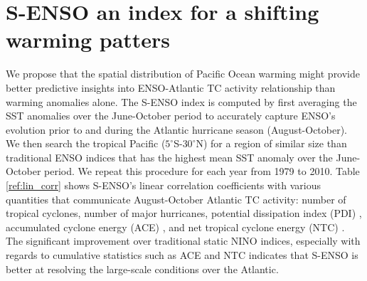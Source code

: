 \section{S-ENSO an index for a shifting warming patters}
We propose that the spatial distribution of Pacific Ocean warming might provide better predictive insights into ENSO-Atlantic TC activity relationship than warming anomalies alone. 
The S-ENSO index is computed by first averaging the SST anomalies over the June-October period to accurately capture ENSO's evolution prior to and during the Atlantic hurricane season (August-October). We then search the tropical Pacific ($5^\circ$S-$30^\circ$N) for a region of similar size than traditional ENSO indices that has the highest mean SST anomaly over the June-October period. %
We repeat this procedure for each year from 1979 to 2010. Table \ref{ref:lin_corr} shows S-ENSO's linear correlation coefficients with various quantities that communicate August-October Atlantic TC activity: number of tropical cyclones, number of major hurricanes, potential dissipation index (PDI) \cite{emanuel2005a}, accumulated cyclone energy (ACE) \cite{Bell2000}, and net tropical cyclone energy (NTC) \cite{goldenberg2001}. The significant improvement over traditional static NINO indices, especially with regards to cumulative statistics such as ACE and NTC indicates that S-ENSO is better at resolving the large-scale conditions over the Atlantic.

